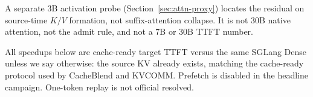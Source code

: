 A separate 3B activation probe (Section~\ref{sec:attn-proxy}) locates
the residual on source-time $K/V$ formation, not suffix-attention
collapse. It is not 30B native attention, not the admit rule, and not
a 7B or 30B TTFT number.

All speedups below are cache-ready target TTFT versus the same SGLang
Dense unless we say otherwise: the source KV already exists, matching
the cache-ready protocol used by CacheBlend and KVCOMM. Prefetch is
disabled in the headline campaign. One-token replay is not official
resolved.
